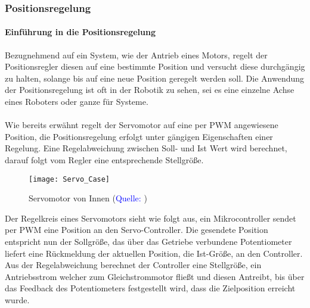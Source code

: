 \documentclass[titlepage,12pt,twoside]{article}
\begin{document}
\subsubsection{Positionsregelung}
\paragraph{Einführung in die Positionsregelung}
\hfill \break
\hfill \break
Bezugnehmend auf ein System, wie der Antrieb eines Motors, regelt der 
Positionsregler diesen auf eine bestimmte Position und versucht diese 
durchgängig zu halten, solange bis auf eine neue Position geregelt 
werden soll. Die Anwendung der Positionsregelung ist oft in der Robotik 
zu sehen, sei es eine einzelne Achse eines Roboters oder ganze für 
Systeme. \\
\\
Wie bereits erwähnt regelt der Servomotor auf eine per PWM angewiesene Position, die 
Positionsregelung erfolgt unter gängigen Eigenschaften einer Regelung. Eine 
Regelabweichung zwischen Soll- und Ist Wert wird berechnet, darauf folgt vom Regler 
eine entsprechende Stellgröße. \\
\begin{figure}[H]
	\begin{center}
		\scalebox{0.8}
		{\texttt{[image: Servo\_Case]}}
		\caption{Servomotor von Innen (\textcolor{blue}{Quelle: \cite{Q13}})}
		\label{fig:Servo_Case}
	\end{center}
\end{figure}
\hfill \break
Der Regelkreis eines Servomotors sieht wie folgt aus, ein Mikrocontroller sendet per 
PWM eine Position an den Servo-Controller. Die gesendete Position entspricht nun der 
Sollgröße, das über das Getriebe verbundene Potentiometer liefert eine Rückmeldung 
der aktuellen Position, die Ist-Größe, an den Controller. Aus der Regelabweichung 
berechnet der Controller eine Stellgröße, ein Antriebsstrom welcher zum Gleichstrommotor 
fließt und diesen Antreibt, bis über das Feedback des Potentiometers festgestellt 
wird, dass die Zielposition erreicht wurde. \\
\end{document}
